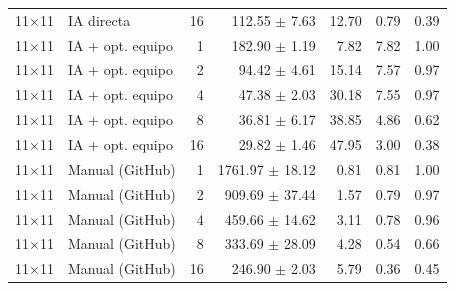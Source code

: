 \begin{tabular}{llrrrrr}
11$\times$11 & IA directa & 16 & 112.55 $\pm$ 7.63 & 12.70 & 0.79 & 0.39 \\
11$\times$11 & IA + opt. equipo & 1 & 182.90 $\pm$ 1.19 & 7.82 & 7.82 & 1.00 \\
11$\times$11 & IA + opt. equipo & 2 & 94.42 $\pm$ 4.61 & 15.14 & 7.57 & 0.97 \\
11$\times$11 & IA + opt. equipo & 4 & 47.38 $\pm$ 2.03 & 30.18 & 7.55 & 0.97 \\
11$\times$11 & IA + opt. equipo & 8 & 36.81 $\pm$ 6.17 & 38.85 & 4.86 & 0.62 \\
11$\times$11 & IA + opt. equipo & 16 & 29.82 $\pm$ 1.46 & 47.95 & 3.00 & 0.38 \\
11$\times$11 & Manual (GitHub) & 1 & 1761.97 $\pm$ 18.12 & 0.81 & 0.81 & 1.00 \\
11$\times$11 & Manual (GitHub) & 2 & 909.69 $\pm$ 37.44 & 1.57 & 0.79 & 0.97 \\
11$\times$11 & Manual (GitHub) & 4 & 459.66 $\pm$ 14.62 & 3.11 & 0.78 & 0.96 \\
11$\times$11 & Manual (GitHub) & 8 & 333.69 $\pm$ 28.09 & 4.28 & 0.54 & 0.66 \\
11$\times$11 & Manual (GitHub) & 16 & 246.90 $\pm$ 2.03 & 5.79 & 0.36 & 0.45 \\
\bottomrule
\end{tabular}
